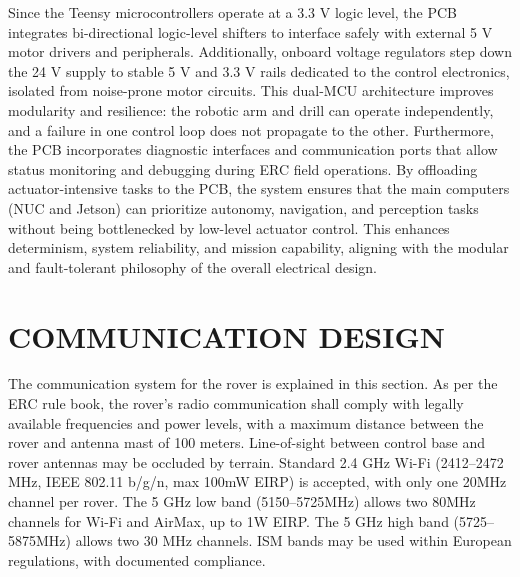 \documentclass[letterpaper, 10 pt, conference]{ieeeconf}  %
\begin{document}
Since the Teensy microcontrollers operate at a 3.3 V logic level, the PCB integrates bi-directional logic-level shifters to interface safely with external 5 V motor drivers and peripherals. Additionally, onboard voltage regulators step down the 24 V supply to stable 5 V and 3.3 V rails dedicated to the control electronics, isolated from noise-prone motor circuits. This dual-MCU architecture improves modularity and resilience: the robotic arm and drill can operate independently, and a failure in one control loop does not propagate to the other. Furthermore, the PCB incorporates diagnostic interfaces and communication ports that allow status monitoring and debugging during ERC field operations. By offloading actuator-intensive tasks to the PCB, the system ensures that the main computers (NUC and Jetson) can prioritize autonomy, navigation, and perception tasks without being bottlenecked by low-level actuator control. This enhances determinism, system reliability, and mission capability, aligning with the modular and fault-tolerant philosophy of the overall electrical design.


\section{COMMUNICATION DESIGN}
The communication system for the rover is explained in this section. As per the ERC rule book, the rover’s radio communication shall comply with legally available frequencies and power levels, with a maximum distance between the rover and antenna mast of 100 meters. Line-of-sight between control base and rover antennas may be occluded by terrain. Standard 2.4 GHz Wi-Fi (2412–2472 MHz, IEEE 802.11 b/g/n, max 100mW EIRP) is accepted, with only one 20MHz channel per rover. The 5 GHz low band (5150–5725MHz) allows two 80MHz channels for Wi-Fi and AirMax, up to 1W EIRP. The 5 GHz high band (5725–5875MHz) allows two 30 MHz channels. ISM bands may be used within European regulations, with documented compliance.
\end{document}

